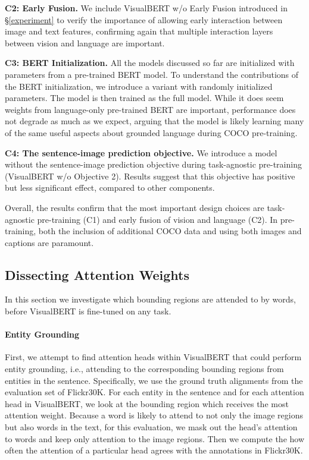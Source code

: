 \documentclass{article} \usepackage{iclr2019_conference,times}
\newcommand{\model}{VisualBERT\xspace}
\newcommand{\modelby}{VisualBERT w/o Early Fusion\xspace}
\begin{document}
\textbf{C2: Early Fusion.} We include \modelby introduced in \S \ref{experiment} to verify the importance of allowing early interaction between image and text features, confirming again that multiple interaction layers between vision and language are important. 

\textbf{C3: BERT Initialization.}
All the models discussed so far are initialized with parameters from a pre-trained BERT model. 
To understand the contributions of the BERT initialization, we introduce a variant with randomly initialized parameters. 
The model is then trained as the full model.
While it does seem weights from language-only pre-trained BERT are important, performance does not degrade as much as we expect, arguing that the model is likely learning many of the same useful aspects about grounded language during COCO pre-training.

\textbf{C4: The sentence-image prediction objective.}
We introduce a model without the sentence-image prediction objective during task-agnostic pre-training (\model w/o Objective 2). Results suggest that this objective has positive but less significant effect, compared to other components.

Overall, the results confirm that the most important design choices are task-agnostic pre-training (C1) and early fusion of vision and language (C2).  In pre-training, both the inclusion of additional COCO data and using both images and captions are paramount. 


\subsection{Dissecting Attention Weights}
\label{sec:analysis}

\label{sec:entitygrounding}


In this section we investigate which bounding regions are attended to by words, before \model is fine-tuned on any task.

\paragraph{Entity Grounding} First, we attempt to find attention heads within \model that could perform entity grounding, i.e., attending to the corresponding bounding regions from entities in the sentence. Specifically, we use the ground truth alignments from the evaluation set of Flickr30K. For each entity in the sentence and for each attention head in \model, we look at the bounding region which receives the most attention weight.
Because a word is likely to attend to not only the image regions but also words in the text, for this evaluation, we mask out the head's attention to words and keep only attention to the image regions.
Then we compute the how often the attention of a particular head agrees with the annotations in Flickr30K.
\end{document}
